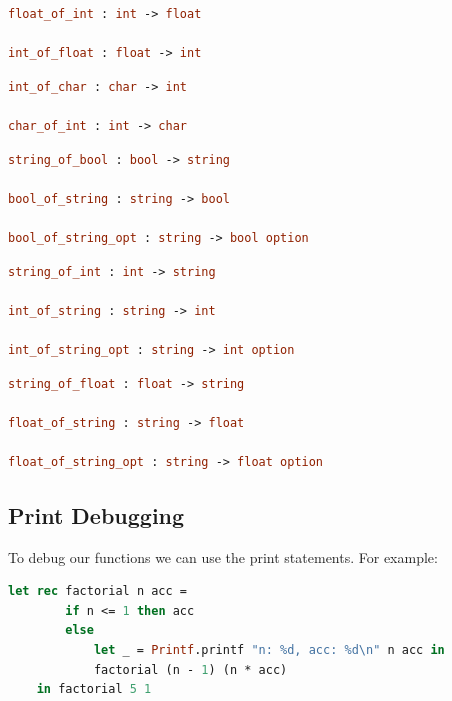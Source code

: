 \begin{Def}

\begin{lstlisting}[language=OCaml, caption={Integer and Float Conversions}, numbers=none]
float_of_int : int -> float

int_of_float : float -> int
\end{lstlisting}

\begin{lstlisting}[language=OCaml, caption={Character and Integer Conversions}, numbers=none]
int_of_char : char -> int

char_of_int : int -> char
\end{lstlisting}

\begin{lstlisting}[language=OCaml, caption={Boolean and String Conversions}, numbers=none]
string_of_bool : bool -> string

bool_of_string : string -> bool

bool_of_string_opt : string -> bool option
\end{lstlisting}

\begin{lstlisting}[language=OCaml, caption={String and Integer Conversions}, numbers=none]
string_of_int : int -> string

int_of_string : string -> int

int_of_string_opt : string -> int option
\end{lstlisting}

\begin{lstlisting}[language=OCaml, caption={String and Float Conversions}, numbers=none]
string_of_float : float -> string

float_of_string : string -> float

float_of_string_opt : string -> float option
\end{lstlisting}

\end{Def}

\newpage

\newpage 

\subsection{Print Debugging}

To debug our functions we can use the print statements. For example:

\begin{lstlisting}[language=OCaml, caption={Print Debugging}]
    let rec factorial n acc =
        if n <= 1 then acc
        else 
            let _ = Printf.printf "n: %d, acc: %d\n" n acc in
            factorial (n - 1) (n * acc)
    in factorial 5 1
\end{lstlisting}

